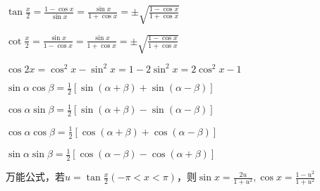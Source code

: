 \begin{spacing}{\hangju}
    \noindent $\tan{\frac{x}{2}}=\frac{1-\cos{x}}{\sin{x}}=\frac{\sin{x}}{1+\cos{x}}=\pm\sqrt{\frac{1-\cos{x}}{1+\cos{x}}}$

    \noindent $\cot{\frac{x}{2}}=\frac{\sin{x}}{1-\cos{x}}=\frac{\sin{x}}{1+\cos{x}}=\pm\sqrt{\frac{1-\cos{x}}{1+\cos{x}}}$

    \noindent $\cos{2x}=\cos^2{x}-\sin^2{x}=1-2\sin^2{x}=2\cos^2{x}-1$

    \noindent $\sin{\alpha}\cos{\beta}=\frac{1}{2}[\sin{(\alpha+\beta)}+\sin{(\alpha-\beta)}]$

    \noindent $\cos{\alpha}\sin{\beta}=\frac{1}{2}[\sin{(\alpha+\beta)}-\sin{(\alpha-\beta)}]$

    \noindent $\cos{\alpha}\cos{\beta}=\frac{1}{2}[\cos{(\alpha+\beta)}+\cos{(\alpha-\beta)}]$

    \noindent $\sin{\alpha}\sin{\beta}=\frac{1}{2}[\cos{(\alpha-\beta)}-\cos{(\alpha+\beta)}]$

    \noindent $\mbox{万能公式，若}u=\tan{\frac{x}{2}}(-\pi<x<\pi)\mbox{，则}\sin{x}=\frac{2u}{1+u^2}, \cos{x}=\frac{1-u^2}{1+u^2}$

\end{spacing}